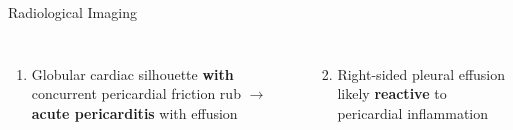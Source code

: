 \documentclass[10pt,aspectratio=169]{beamer}
\begin{document}
\begin{frame}{Radiological Imaging}
  \begin{tcolorbox}[highlightbox,title={\faLightbulb\hspace{4pt}Key Imaging Impressions}]
    \small
    \begin{columns}[T]
      \begin{enumerate}
        \item Globular cardiac silhouette \textbf{with} concurrent pericardial friction rub $\rightarrow$ \textbf{acute pericarditis} with effusion
      \end{enumerate}
      \begin{enumerate}
        \setcounter{enumi}{1}
        \item Right-sided pleural effusion likely \textbf{reactive} to pericardial inflammation
      \end{enumerate}
    \end{columns}
  \end{tcolorbox}
\end{frame}
\end{document}
